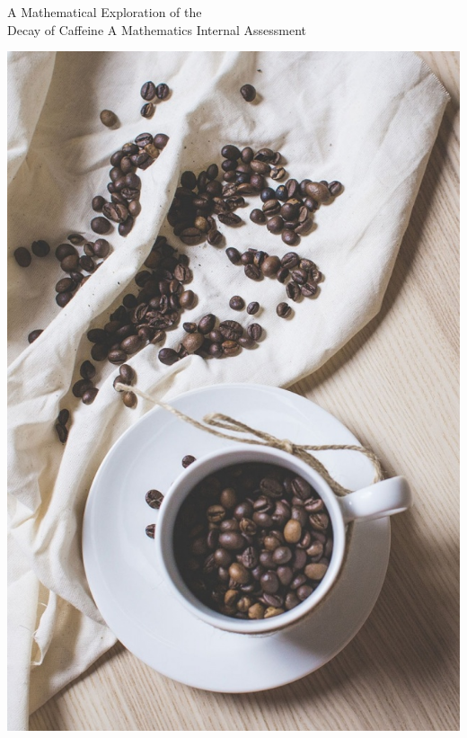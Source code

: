 \documentclass[12pt]{article}
\begin{document}
        
        \author{Candiate code: hjk123}            \begin{titlepage}
                \begin{center}
                \Huge{A Mathematical Exploration of the \\ Decay of Caffeine}
                \break
                {\large A Mathematics Internal Assessment}
                \break                    %
                    
        
                \vspace{12mm}
                \includegraphics[scale=0.38]{coffee1.jpg}
    
            \end{center}
                    \end{titlepage}
        
\end{document}
